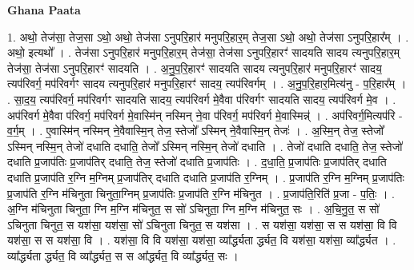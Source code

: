 \documentclass[17pt]{extarticle}
\begin{document}
\textbf{Ghana Paata } \newline

1. अथो॒ तेज॑सा॒ तेज॒सा ऽथो॒ अथो॒ तेज॑सा ऽनुपरि॒हार॑ मनुपरि॒हार॒म् तेज॒सा ऽथो॒ अथो॒ तेज॑सा ऽनुपरि॒हार᳚म् । . अथो॒ इत्यथो᳚ । . तेज॑सा ऽनुपरि॒हार॑ मनुपरि॒हार॒म् तेज॑सा॒ तेज॑सा ऽनुपरि॒हारꣳ॑ सादयति सादय त्यनुपरि॒हार॒म् तेज॑सा॒ तेज॑सा ऽनुपरि॒हारꣳ॑ सादयति । . अ॒नु॒प॒रि॒हारꣳ॑ सादयति सादय त्यनुपरि॒हार॑ मनुपरि॒हारꣳ॑ सादय॒ त्यप॑रिवर्ग॒ मप॑रिवर्गꣳ सादय त्यनुपरि॒हार॑ मनुपरि॒हारꣳ॑ सादय॒ त्यप॑रिवर्गम् । . अ॒नु॒प॒रि॒हार॒मित्य॑नु - प॒रि॒हार᳚म् । . सा॒द॒य॒ त्यप॑रिवर्ग॒ मप॑रिवर्गꣳ सादयति सादय॒ त्यप॑रिवर्ग मे॒वैवा प॑रिवर्गꣳ सादयति सादय॒ त्यप॑रिवर्ग मे॒व । . अप॑रिवर्ग मे॒वैवा प॑रिवर्ग॒ मप॑रिवर्ग मे॒वास्मि॑न् नस्मिन् ने॒वा प॑रिवर्ग॒ मप॑रिवर्ग मे॒वास्मिन्न्॑ । . अप॑रिवर्ग॒मित्यप॑रि - व॒र्ग॒म् । . ए॒वास्मि॑न् नस्मिन् ने॒वैवास्मि॒न् तेज॒ स्तेजो᳚ ऽस्मिन् ने॒वैवास्मि॒न् तेजः॑ । . अ॒स्मि॒न् तेज॒ स्तेजो᳚ ऽस्मिन् नस्मि॒न् तेजो॑ दधाति दधाति॒ तेजो᳚ ऽस्मिन् नस्मि॒न् तेजो॑ दधाति । . तेजो॑ दधाति दधाति॒ तेज॒ स्तेजो॑ दधाति प्र॒जाप॑तिः प्र॒जाप॑तिर् दधाति॒ तेज॒ स्तेजो॑ दधाति प्र॒जाप॑तिः । . द॒धा॒ति॒ प्र॒जाप॑तिः प्र॒जाप॑तिर् दधाति दधाति प्र॒जाप॑ति र॒ग्नि म॒ग्निम् प्र॒जाप॑तिर् दधाति दधाति प्र॒जाप॑ति र॒ग्निम् । . प्र॒जाप॑ति र॒ग्नि म॒ग्निम् प्र॒जाप॑तिः प्र॒जाप॑ति र॒ग्नि म॑चिनुता चिनुता॒ग्निम् प्र॒जाप॑तिः प्र॒जाप॑ति र॒ग्नि म॑चिनुत । . प्र॒जाप॑ति॒रिति॑ प्र॒जा - प॒तिः॒ । . अ॒ग्नि म॑चिनुता चिनुता॒ ग्नि म॒ग्नि म॑चिनुत॒ स सो॑ ऽचिनुता॒ ग्नि म॒ग्नि म॑चिनुत॒ सः । . अ॒चि॒नु॒त॒ स सो॑ ऽचिनुता चिनुत॒ स यश॑सा॒ यश॑सा॒ सो॑ ऽचिनुता चिनुत॒ स यश॑सा । . स यश॑सा॒ यश॑सा॒ स स यश॑सा॒ वि वि यश॑सा॒ स स यश॑सा॒ वि । . यश॑सा॒ वि वि यश॑सा॒ यश॑सा॒ व्या᳚र्द्ध्यता र्द्ध्यत॒ वि यश॑सा॒ यश॑सा॒ व्या᳚र्द्ध्यत । . व्या᳚र्द्ध्यता र्द्ध्यत॒ वि व्या᳚र्द्ध्यत॒ स स आ᳚र्द्ध्यत॒ वि व्या᳚र्द्ध्यत॒ सः । \newline
\end{document}
